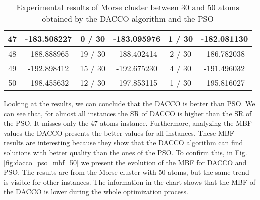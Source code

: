 \begin{table}[!htdp]
\begin{center}
\begin{tabular}{| c | c | c | c | c | c |}
					47 & -183.508227 & 0 / 30 & -183.095976 & 1 / 30 & -182.081130 \\ \hline
					48 & -188.888965 & 19 / 30 & -188.402414 & 2 / 30 & -186.782038 \\ \hline
					49 & -192.898412 & 15 / 30 & -192.675230 & 4 / 30 & -191.496032 \\ \hline
					50 & -198.455632 & 12 / 30 & -197.853115 & 1 / 30 & -195.816027 \\ \hline
				\end{tabular}
			\end{center}
			\caption{Experimental results of Morse cluster between 30 and 50 atoms obtained by the DACCO algorithm and the PSO}
			\label{tab:dacco_vs_pso}
		\end{table}
		
		Looking at the results, we can conclude that the DACCO is better than PSO. We can see that, for almost all instances the SR of DACCO is higher than the SR of the PSO. It misses only the 47 atoms instance. Furthermore, analyzing the MBF values the DACCO presents the better values for all instances. These MBF results are interesting because they show that the DACCO algorithm can find solutions with better quality than the ones of the PSO. To confirm this, in Fig. \ref{fig:dacco_pso_mbf_50} we present the evolution of the MBF for DACCO and PSO. The results are from the Morse cluster with 50 atoms, but the same trend is visible for other instances. The information in the chart shows that the MBF of the DACCO is lower during the whole optimization process.
		
